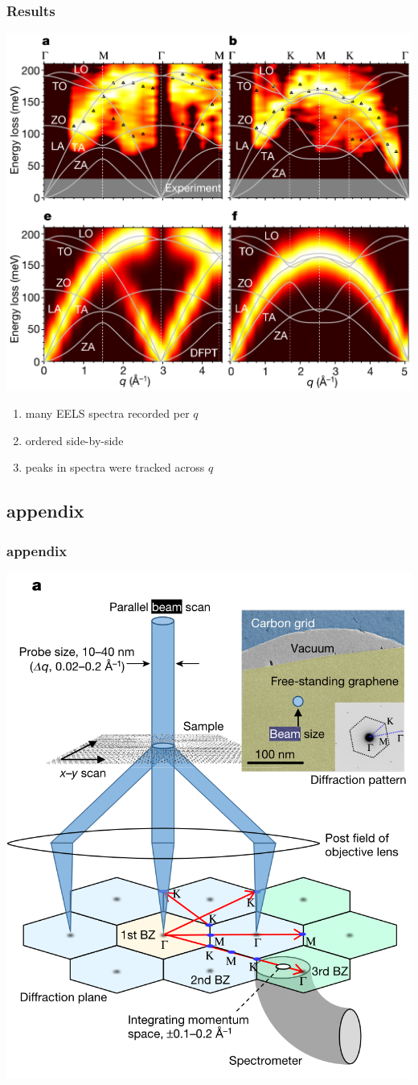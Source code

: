 \documentclass{beamer}
\begin{document}
\begin{frame}
	\frametitle{Results}
	\begin{minipage}{0.7\linewidth}
		\includegraphics[width=1\linewidth, keepaspectratio]{Figures/phonon-disp.png}
	\end{minipage}%
	\begin{minipage}{0.3\linewidth}
		\begin{enumerate}
			\item many EELS spectra recorded per $q$
   			\item ordered side-by-side
   			\item peaks in spectra were tracked across $q$
		\end{enumerate}
	\end{minipage}
\end{frame}

\begin{frame}
	\section{appendix}
	\frametitle{appendix}
	\includegraphics[width=0.6\linewidth, keepaspectratio]{Figures/pbs.png}
\end{frame}
\end{document}
